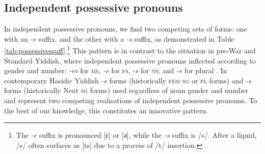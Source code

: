 \documentclass[output=paper, hidelinks]{langscibook}
\begin{document}



\subsection{Independent possessive pronouns}

In independent possessive pronouns, we find two competing sets of forms: one with an \textit{-e} suffix, and the other with a \textit{-s} suffix, as demonstrated in Table \ref{tab:possessivessuff}.\footnote{The \textit{-e} suffix is pronounced [ɛ] or [ә], while the \textit{-s} suffix is /s/. After a liquid, /s/ often surfaces as [ts] due to a process of /t/ insertion.} This pattern is in contrast to the situation in pre-War and Standard Yiddish, where independent possessive pronouns inflected according to gender and number: \textit{-er} for \textsc{ms}, \textit{-e} for \textsc{fs}, \textit{-s} for \textsc{ns}; and \textit{-e} for plural \citep[183--184]{Jacobs05}. In contemporary Hasidic Yiddish \textit{-e} forms (historically \textsc{fem} \textsc{sg} or \textsc{pl} forms) and \textit{-s} forms (historically Neut \textsc{sg} forms) used regardless of noun gender and number and represent two competing realisations of independent possessive pronouns. To the best of our knowledge, this constitutes an innovative pattern. 
\end{document}
